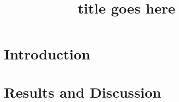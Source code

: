 \documentclass{acmtog2}
\begin{document}
\title{title goes here}
\author{}
\affil{}
\keywords{}

\maketitle


\section{Introduction}
\lipsum[3-7]

\section{Results and Discussion}
\lipsum[10-20]
\end{document}
